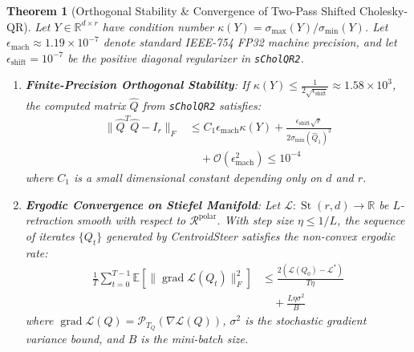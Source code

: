 \documentclass[10pt,twocolumn,letterpaper]{article}
\newtheorem{theorem}{Theorem}
\begin{document}
\begin{theorem}[Orthogonal Stability \& Convergence of Two-Pass Shifted Cholesky-QR]
\label{thm:convergence}
Let $Y \in \mathbb{R}^{d \times r}$ have condition number $\kappa(Y) = \sigma_{\max}(Y) / \sigma_{\min}(Y)$. Let $\epsilon_{\text{mach}} \approx 1.19 \times 10^{-7}$ denote standard IEEE-754 FP32 machine precision, and let $\epsilon_{\text{shift}} = 10^{-7}$ be the positive diagonal regularizer in \texttt{sCholQR2}.
\begin{enumerate}
    \item \textbf{Finite-Precision Orthogonal Stability}: If $\kappa(Y) \le \frac{1}{2 \sqrt{\epsilon_{\text{shift}}}} \approx 1.58 \times 10^3$, the computed matrix $\hat{Q}$ from \texttt{sCholQR2} satisfies:
    \begin{equation}
    \begin{aligned}
        \| \hat{Q}^T \hat{Q} - I_r \|_F &\le C_1 \epsilon_{\text{mach}} \kappa(Y) + \frac{\epsilon_{\text{shift}} \sqrt{r}}{2 \sigma_{\min}(\hat{Q}_1)^2} \\
        &\quad + \mathcal{O}(\epsilon_{\text{mach}}^2) \le 10^{-4}
    \end{aligned}
    \end{equation}
    where $C_1$ is a small dimensional constant depending only on $d$ and $r$.
    \item \textbf{Ergodic Convergence on Stiefel Manifold}: Let $\mathcal{L}: \operatorname{St}(r, d) \to \mathbb{R}$ be $L$-retraction smooth with respect to $\mathcal{R}^{\text{polar}}$. With step size $\eta \le 1/L$, the sequence of iterates $\{Q_t\}$ generated by CentroidSteer satisfies the non-convex ergodic rate:
    \begin{equation}
    \begin{aligned}
        \frac{1}{T} \sum_{t=0}^{T-1} \mathbb{E}\left[ \| \operatorname{grad} \mathcal{L}(Q_t) \|_F^2 \right] &\le \frac{2 (\mathcal{L}(Q_0) - \mathcal{L}^*)}{T \eta} \\
        &\quad + \frac{L \eta \sigma^2}{B}
    \end{aligned}
    \end{equation}
    where $\operatorname{grad} \mathcal{L}(Q) = \mathcal{P}_{T_Q}(\nabla \mathcal{L}(Q))$, $\sigma^2$ is the stochastic gradient variance bound, and $B$ is the mini-batch size.
\end{enumerate}
\end{theorem}
\end{document}
